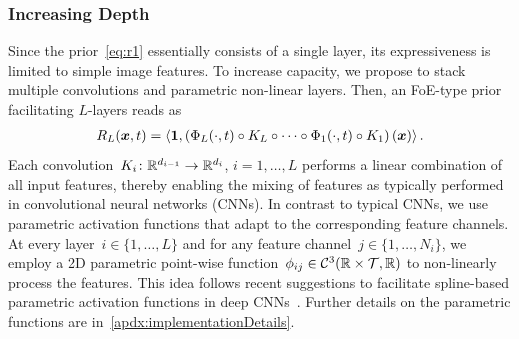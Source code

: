 \documentclass{article}
\newcommand{\C}{\mathcal{C}}
\newcommand{\T}{\mathcal{T}}
\newcommand{\scal}[2]{\left\langle#1,#2\right\rangle}
\renewcommand{\vec}[1]{\mathbf{#1}}
\theoremstyle{plain}
\theoremstyle{definition}
\theoremstyle{remark}
\begin{document}
\subsubsection{Increasing Depth}
Since the prior~\eqref{eq:r1} essentially consists of a single layer, its expressiveness is limited to simple image features.
To increase capacity, we propose to stack multiple convolutions and parametric non-linear layers.
Then, an FoE-type prior facilitating $L$-layers reads as
\begin{align} \label{eq:RL}
R_L(\vx,t) = \scal{\vec{1}}{\left(\Phi_L(\cdot,t)\circ K_L\circ\cdots\circ\Phi_1(\cdot, t) \circ K_1\right)(\vx)}.
\end{align}
Each convolution~$K_i\colon\mathbb{R}^{d_{i-1}}\to\mathbb{R}^{d_i}$, $i=1,\ldots,L$ performs a linear combination of all input features, thereby enabling the mixing of features as typically performed in convolutional neural networks (CNNs).
In contrast to typical CNNs, we use parametric activation functions that adapt to the corresponding feature channels.
At every layer~$i\in\{1,\ldots,L\}$ and for any feature channel~$j\in\{1,\ldots,N_i\}$, we employ a 2D parametric point-wise function~$\phi_{ij}\in\C^3(\R\times\T,\R)$ to non-linearly process the features.
This idea follows recent suggestions to facilitate spline-based parametric activation functions in deep CNNs~\citep{OcMe18,AzGu20}.
Further details on the parametric functions are in~\cref{apdx:implementationDetails}.
\end{document}
